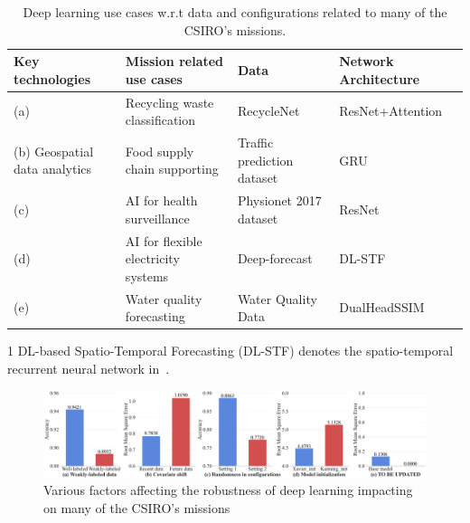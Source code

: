 \begin{table}[t]
    \centering
    \caption{Deep learning use cases w.r.t data and configurations related to many of the CSIRO's missions.}
\footnotesize
 \begin{threeparttable}
    \begin{tabular}{llll}
        \toprule
        \textbf{Key technologies} &\textbf{Mission related use cases} &  \textbf{Data} & \textbf{Network Architecture}   \\
        \midrule
        (a) & Recycling waste classification & RecycleNet~\cite{trashnet} & ResNet+Attention~\cite{RecycleNet_trash_images} \\ 
        (b) Geospatial data analytics & Food supply chain supporting  & Traffic prediction dataset~\cite{KaggleTraffic} & GRU~\cite{chung2014empirical} \\
        (c) & AI for health surveillance & Physionet 2017 dataset~\cite{clifford2017af} & ResNet~\cite{hannun2019cardiologist} \\
        (d) & AI for flexible electricity systems & Deep-forecast~\cite{ghaderi2017deepforecast} & DL-STF\tnote{1}~\cite{ghaderi2017deepforecast} \\
        (e) & Water quality forecasting & Water Quality Data~\cite{zhang2019ssim} & DualHeadSSIM~\cite{zhang2021dual} \\
        \bottomrule
        
    \end{tabular}
    \begin{tablenotes}
    \item[1] DL-based Spatio-Temporal Forecasting (DL-STF) denotes the spatio-temporal recurrent neural network in~\cite{ghaderi2017deepforecast}.
  \end{tablenotes}
    \end{threeparttable}
\label{tab:existing}
\end{table} 

\begin{figure}[t]
    \centering
    \includegraphics[width=\linewidth]{fig/factors.pdf}
    \caption{Various factors affecting the robustness of deep learning impacting on many of the CSIRO's missions  }
    \label{fig:motivation}
\end{figure}

